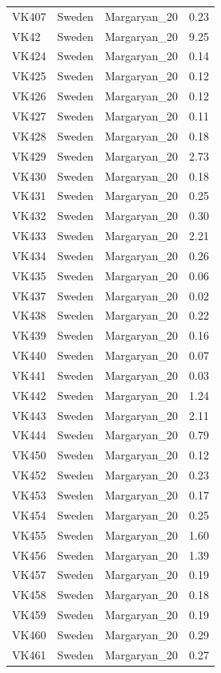 \begin{longtable}[t]{lllr}
VK407 & Sweden & Margaryan\_20 & 0.23\\
VK42 & Sweden & Margaryan\_20 & 9.25\\
VK424 & Sweden & Margaryan\_20 & 0.14\\
VK425 & Sweden & Margaryan\_20 & 0.12\\
VK426 & Sweden & Margaryan\_20 & 0.12\\
VK427 & Sweden & Margaryan\_20 & 0.11\\
VK428 & Sweden & Margaryan\_20 & 0.18\\
VK429 & Sweden & Margaryan\_20 & 2.73\\
VK430 & Sweden & Margaryan\_20 & 0.18\\
VK431 & Sweden & Margaryan\_20 & 0.25\\
VK432 & Sweden & Margaryan\_20 & 0.30\\
VK433 & Sweden & Margaryan\_20 & 2.21\\
VK434 & Sweden & Margaryan\_20 & 0.26\\
VK435 & Sweden & Margaryan\_20 & 0.06\\
VK437 & Sweden & Margaryan\_20 & 0.02\\
VK438 & Sweden & Margaryan\_20 & 0.22\\
VK439 & Sweden & Margaryan\_20 & 0.16\\
VK440 & Sweden & Margaryan\_20 & 0.07\\
VK441 & Sweden & Margaryan\_20 & 0.03\\
VK442 & Sweden & Margaryan\_20 & 1.24\\
VK443 & Sweden & Margaryan\_20 & 2.11\\
VK444 & Sweden & Margaryan\_20 & 0.79\\
VK450 & Sweden & Margaryan\_20 & 0.12\\
VK452 & Sweden & Margaryan\_20 & 0.23\\
VK453 & Sweden & Margaryan\_20 & 0.17\\
VK454 & Sweden & Margaryan\_20 & 0.25\\
VK455 & Sweden & Margaryan\_20 & 1.60\\
VK456 & Sweden & Margaryan\_20 & 1.39\\
VK457 & Sweden & Margaryan\_20 & 0.19\\
VK458 & Sweden & Margaryan\_20 & 0.18\\
VK459 & Sweden & Margaryan\_20 & 0.19\\
VK460 & Sweden & Margaryan\_20 & 0.29\\
VK461 & Sweden & Margaryan\_20 & 0.27\\

\end{longtable}
